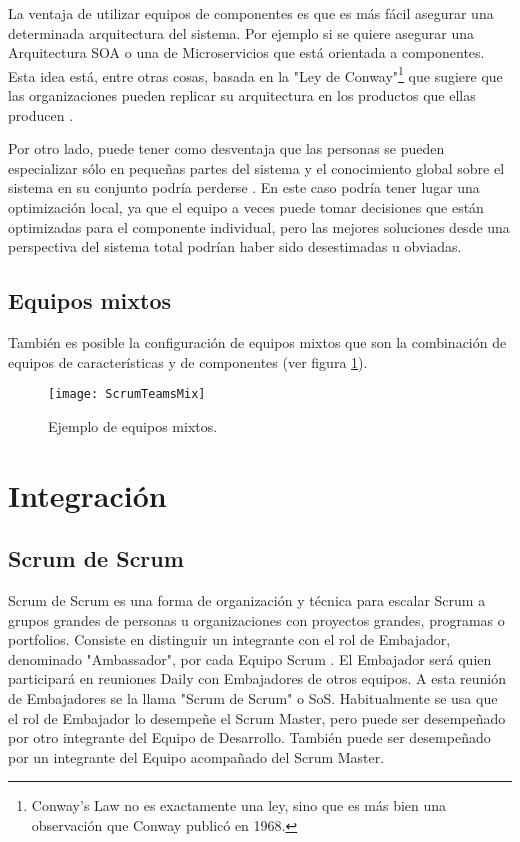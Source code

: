 La ventaja de utilizar equipos de componentes es que es más fácil asegurar una determinada arquitectura del sistema. Por ejemplo si se quiere asegurar una Arquitectura SOA o una de Microservicios que está orientada a componentes. Esta idea está, entre otras cosas, basada en la "Ley de Conway"\footnote{Conway's Law \cite{Conway-1968} no es exactamente una ley, sino que es más bien una observación que Conway publicó en 1968.} que sugiere que las organizaciones pueden replicar su arquitectura en los productos que ellas producen \cite{Martin-Fowler-2014}. 

Por otro lado, puede tener como desventaja que las personas se pueden especializar sólo en pequeñas partes del sistema y el conocimiento global sobre el sistema en su conjunto podría perderse \cite{Scrum-Institute-2015}. En este caso podría tener lugar una optimización local, ya que el equipo a veces puede tomar decisiones que están optimizadas para el componente individual, pero las mejores soluciones desde una perspectiva del sistema total podrían haber sido desestimadas u obviadas.


\subsection{Equipos mixtos}

También es posible la configuración de equipos mixtos que son la combinación de equipos de características y de componentes (ver figura \ref{fig:ScrumTeamsMix}).

\begin{figure}[h]
  \centering
  \texttt{[image: ScrumTeamsMix]}
  \caption{Ejemplo de equipos mixtos.}
  \centering
  \label{fig:ScrumTeamsMix} %
\end{figure}

\section{Integración}

\subsection{Scrum de Scrum}

Scrum de Scrum es una forma de organización y técnica para escalar Scrum a grupos grandes de personas u organizaciones con proyectos grandes, programas o portfolios. Consiste en distinguir un integrante con el rol de Embajador, denominado "Ambassador", por cada Equipo Scrum \cite{Stefanini-2013}. El Embajador será quien participará en reuniones Daily con Embajadores de otros equipos. A esta reunión de Embajadores se la llama "Scrum de Scrum" o SoS. Habitualmente se usa que el rol de Embajador lo desempeñe el Scrum Master, pero puede ser desempeñado por otro integrante del Equipo de Desarrollo. También puede ser desempeñado por un integrante del Equipo acompañado del Scrum Master.

